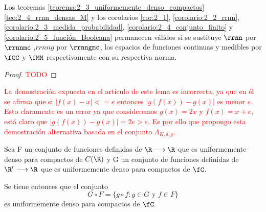 \begin{corolario}\label{corolario:2_6}
    Los teoremas 
    \ref{teorema:2_3_uniformemente_denso_compactos}
    \ref{teo:2_4_rrnn_densas_M} 
    y los corolarios
    \ref{cor:2_1}, 
    \ref{corolario:2_2_rrnn},
    \ref{corolario:2_3_medida_probabilidad},
    \ref{corolario:2_4_conjunto_finito}
    y 
    \ref{corolario:2_5_función_Booleana}
    permanecen válidos si se sustituye $\rrnn$ por $\rrnnmc$
    ,$rrnng$ por $\rrnngmc$, 
    los espacios de funciones continuas y medibles por $\fCC$ y $\fMM$ respectivamente con su respectiva norma.
\end{corolario}
\begin{proof}
    \textcolor{red}{TODO}
\end{proof}

\textcolor{red}{La demostración expuesta en el artículo de este lema es incorrecta, ya que en él se afirma que 
si $|f(x) - x| <= e$ entonces $|g(f(x))- g(x)|$ es menor $e$. Esto claramente es un error ya que 
consideremos $g(x) = 2x$ y $f(x)=x+e$, está claro que $|g(f(x))- g(x)|=2e>e$. Es por ello que propongo esta
demostración alternativa basada en el conjunto $\Lambda_{K, \delta, g}$.}
\begin{lema}
    Sea F un conjunto de funciones definidas de $\R \longrightarrow \R$ que es uniformemente 
    denso para compactos de $C(\R)$ y
    G un conjunto de funciones definidas de $\R^r \longrightarrow \R$ que es uniformemente 
    denso para compactos de $\fC$.
    
    Se tiene entonces que el conjunto 
    \begin{equation}
        G \circ F 
        = 
        \{
            g \circ f : g \in G \text{ y } f \in F
        \}
    \end{equation}
    es uniformemente denso para compactos de $\fC.$
\end{lema}

